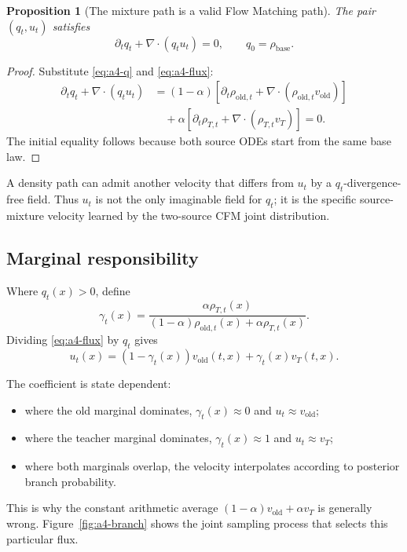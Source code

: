\documentclass[11pt,a4paper]{article}
\newcommand{\vold}{v_{\mathrm{old}}}
\newcommand{\vT}{v_T}
\theoremstyle{plain}
\newtheorem{proposition}[theorem]{Proposition}
\theoremstyle{definition}
\begin{document}
\begin{proposition}[The mixture path is a valid Flow Matching path]
\label{prop:mixture-continuity}
The pair $(q_t,u_t)$ satisfies
\begin{equation}
\partial_tq_t+\nabla\!\cdot(q_tu_t)=0,
\qquad
q_0=\rho_{\mathrm{base}}.
\label{eq:a4-continuity}
\end{equation}
\end{proposition}

\begin{proof}
Substitute \eqref{eq:a4-q} and \eqref{eq:a4-flux}:
\begin{align*}
\partial_tq_t+\nabla\!\cdot(q_tu_t)
&=
(1-\alpha)
\left[
  \partial_t\rho_{\mathrm{old},t}
  +\nabla\!\cdot(\rho_{\mathrm{old},t}\vold)
\right]\\
&\quad+
\alpha
\left[
  \partial_t\rho_{T,t}
  +\nabla\!\cdot(\rho_{T,t}\vT)
\right]
=0.
\end{align*}
The initial equality follows because both source ODEs start from the same base law.
\end{proof}

A density path can admit another velocity that differs from $u_t$ by a $q_t$-divergence-free
field.  Thus $u_t$ is not the only imaginable field for $q_t$; it is the specific source-mixture
velocity learned by the two-source CFM joint distribution.

\subsection{Marginal responsibility}

Where $q_t(x)>0$, define
\begin{equation}
\gamma_t(x)
=
\frac{\alpha\rho_{T,t}(x)}{
  (1-\alpha)\rho_{\mathrm{old},t}(x)+\alpha\rho_{T,t}(x)
}.
\label{eq:a4-gamma}
\end{equation}
Dividing \eqref{eq:a4-flux} by $q_t$ gives
\begin{equation}
\boxed{
u_t(x)
=(1-\gamma_t(x))\vold(t,x)
+\gamma_t(x)\vT(t,x)
}.
\label{eq:a4-u}
\end{equation}

The coefficient is state dependent:
\begin{itemize}[leftmargin=1.5em]
\item where the old marginal dominates, $\gamma_t(x)\approx0$ and $u_t\approx\vold$;
\item where the teacher marginal dominates, $\gamma_t(x)\approx1$ and $u_t\approx\vT$;
\item where both marginals overlap, the velocity interpolates according to posterior branch
      probability.
\end{itemize}
This is why the constant arithmetic average
$(1-\alpha)\vold+\alpha\vT$ is generally wrong.
Figure~\ref{fig:a4-branch} shows the joint sampling process that selects this particular flux.
\end{document}

